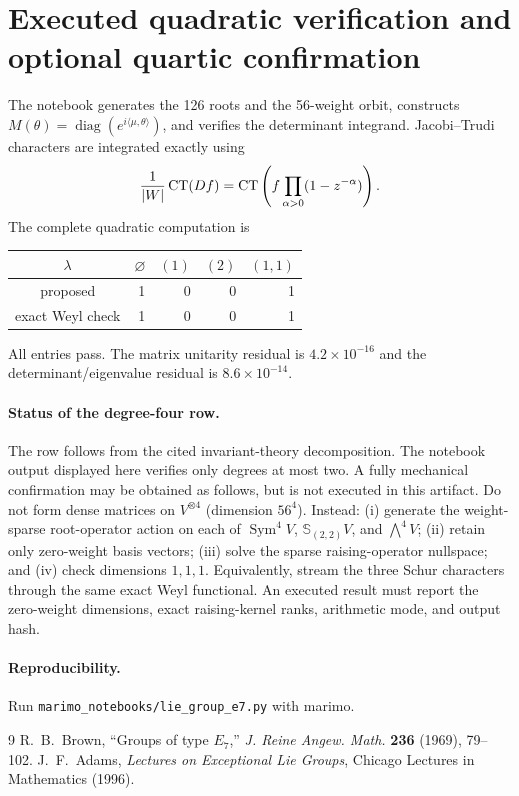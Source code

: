 \documentclass[10pt]{article}
\begin{document}
\section{Executed quadratic verification and optional quartic confirmation}
The notebook generates the 126 roots and the 56-weight orbit, constructs
$M(\theta)=\operatorname{diag}(e^{i\langle\mu,\theta\rangle})$, and verifies
the determinant integrand.  Jacobi--Trudi characters are integrated exactly
using
\[
 \frac1{|W|}\operatorname{CT}(Df)=\operatorname{CT}\left(f\prod_{\alpha>0}(1-z^{-\alpha})\right).
\]
The complete quadratic computation is
\begin{center}\small
\begin{tabular}{@{}c|rrrr@{}}\toprule
$\lambda$&$\varnothing$&$(1)$&$(2)$&$(1,1)$\\\midrule
proposed&1&0&0&1\\
exact Weyl check&1&0&0&1\\\bottomrule
\end{tabular}
\end{center}
All entries pass.  The matrix unitarity residual is $4.2\times10^{-16}$ and
the determinant/eigenvalue residual is $8.6\times10^{-14}$.

\paragraph{Status of the degree-four row.}
The row follows from the cited invariant-theory decomposition.  The notebook
output displayed here verifies only degrees at most two.  A fully mechanical
confirmation may be obtained as follows, but is not executed in this
artifact.  Do not form dense matrices on
$V^{\otimes4}$ (dimension $56^4$).  Instead: (i) generate the weight-sparse
root-operator action on each of $\operatorname{Sym}^4V$, $\mathbb S_{(2,2)}V$,
and $\bigwedge^4V$; (ii) retain only zero-weight basis vectors; (iii) solve the
sparse raising-operator nullspace; and (iv) check dimensions $1,1,1$.
Equivalently, stream the three Schur characters through the same exact Weyl
functional.  An executed result must report the zero-weight dimensions,
exact raising-kernel ranks, arithmetic mode, and output hash.

\paragraph{Reproducibility.} Run \texttt{marimo\_notebooks/lie\_group\_e7.py} with marimo.
\begin{thebibliography}{9}
 R.~B.~Brown, ``Groups of type $E_7$,'' \emph{J. Reine Angew.
Math.} \textbf{236} (1969), 79--102.
 J.~F.~Adams, \emph{Lectures on Exceptional Lie Groups},
Chicago Lectures in Mathematics (1996).
\end{thebibliography}
\end{document}
